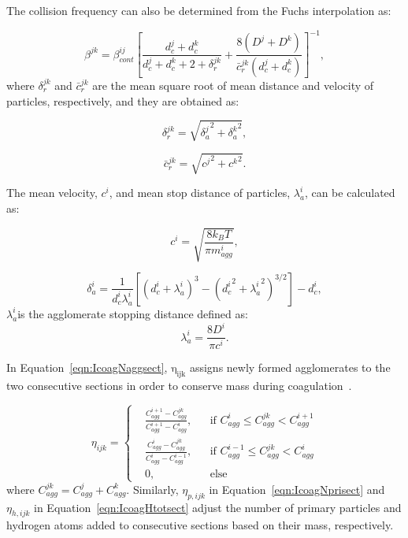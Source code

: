 The collision frequency can also be determined from the Fuchs interpolation as:

\begin{equation}
	\beta^{jk}=
	\beta^{ij}_{cont}
	\left[
	\frac{d^j_c+d^k_c}{d^j_c+d^k_c+2+\delta^{jk}_r}+
	\frac{8\left(D^j+D^k\right)}
	{\bar{c}^{jk}_r\left(d^j_c+d^k_c\right)}
	\right]^{-1},
	\label{eqn:betafuchssect}
\end{equation}
\noindent where ${\delta^{jk}_r}$ and ${\bar{c}^{jk}_r}$ are the mean square root of mean distance and velocity of particles, respectively, and they are obtained as:

\begin{equation}
	\delta^{jk}_r=
	\sqrt{
		{\delta^j_a}^2+{\delta^k_a}^2
	}
	\label{eqn:sqrtmeandist},
\end{equation}

\begin{equation}
	\bar{c}^{jk}_r=
	\sqrt{
		{c^j}^2+{c^k}^2
	}
	\label{eqn:sqrtmeanvel}.
\end{equation}

The mean velocity, ${c^i}$, and mean stop distance of particles, ${\lambda^i_a}$, can be calculated as:

\begin{equation}
	c^i = \sqrt{\frac{8k_B T}{\pi m^i_{agg}}},
	\label{eqn:meanvel}
\end{equation}

\begin{equation}
	\delta^i_a=\frac{1}{d^i_c\lambda^i_a}
	\left[
	\left(
	d^i_c+\lambda^i_a
	\right)^3
	-\left(
	{d^i_c}^2+{\lambda^i_a}^2
	\right)^{3 / 2}
	\right]
	-d^i_{c},
	\label{eqn:meandist}
\end{equation}
\noindent $\lambda^i_a $is the agglomerate stopping distance defined as:
\begin{equation}
	\lambda^i_a = \frac{8D^i}{\pi c^i}
	\label{eqn:stopdist}.
\end{equation}




In Equation~\eqref{eqn:IcoagNaggsect}, $\mathrm{\eta_{ijk}}$ assigns newly formed agglomerates to the two consecutive sections in order to conserve mass during coagulation~\citep{park2005aerosol}.

\begin{equation}
	\eta_{ijk}=
	\left\{
	\begin{aligned}
		&\frac{C^{i+1}_{agg}-C^{jk}_{agg}}{C^{i+1}_{agg}-C^i_{agg}},
		&&
		\text{if } C^i_{agg} \le C^{jk}_{agg} < C^{i+1}_{agg}
		\\
		&\frac{C^{i}_{agg}-C^{jk}_{agg}}{C^{i}_{agg}-C^{i-1}_{agg}}, 
		&&
		\text{if } C^{i-1}_{agg} \le C^{jk}_{agg} < C^{i}_{agg}
		\\
		&0,
		&&\text{else}
	\end{aligned}
	\right.
	\label{eqn:etacoag}
\end{equation}
\noindent where ${C^{jk}_{agg}=C^{j}_{agg}+C^{k}_{agg}}$. Similarly, $\eta_{p,ijk}$ in Equation~\eqref{eqn:IcoagNprisect} and $\eta_{h,ijk}$ in Equation~\eqref{eqn:IcoagHtotsect} adjust the number of primary particles and hydrogen atoms added to consecutive sections based on their mass, respectively.

